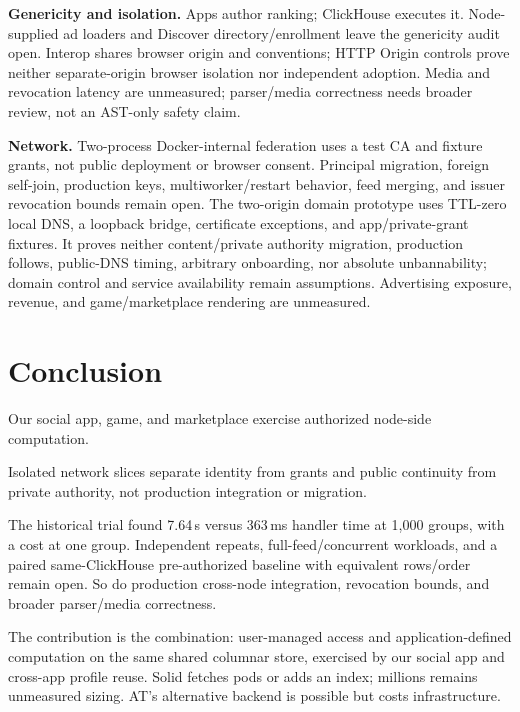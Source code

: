\documentclass[sigconf, nonacm]{acmart}
\begin{document}
\textbf{Genericity and isolation.} Apps author ranking; ClickHouse executes
it. Node-supplied ad loaders and Discover directory/enrollment leave the
genericity audit open. Interop shares browser origin and conventions;
HTTP Origin controls prove neither separate-origin browser isolation nor
independent adoption. Media and revocation latency are unmeasured;
parser/media correctness needs broader review, not an AST-only safety claim.

\textbf{Network.} Two-process Docker-internal federation uses a test CA and
fixture grants, not public deployment or browser consent. Principal
migration, foreign self-join, production keys, multiworker/restart behavior,
feed merging, and issuer revocation bounds remain open. The two-origin
domain prototype uses TTL-zero local DNS, a loopback bridge, certificate
exceptions, and app/private-grant fixtures. It proves neither content/private
authority migration, production follows, public-DNS timing, arbitrary
onboarding, nor absolute unbannability; domain control and service
availability remain assumptions. Advertising exposure, revenue, and
game/marketplace rendering are unmeasured.

\section{Conclusion}
\label{sec:conclusion}

Our social app, game, and marketplace exercise authorized node-side computation.

Isolated network slices separate identity from grants and public continuity
from private authority, not production integration or migration.

The historical trial found 7.64\,s versus 363\,ms handler time at 1,000
groups, with a cost at one group. Independent repeats, full-feed/concurrent
workloads, and a paired same-ClickHouse pre-authorized baseline with
equivalent rows/order remain open. So do production cross-node integration,
revocation bounds, and broader parser/media correctness.

The contribution is the combination: user-managed access and
application-defined computation on the same shared columnar store,
exercised by our social app and cross-app profile reuse. Solid fetches pods
or adds an index; millions remains unmeasured sizing. AT's alternative
backend is possible but costs infrastructure.



\end{document}

